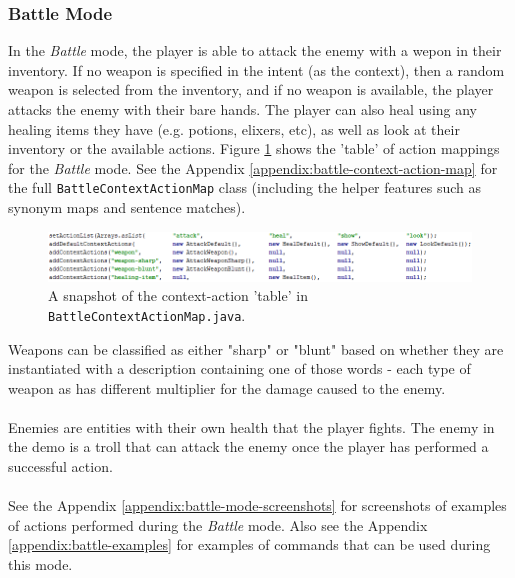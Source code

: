 \documentclass[11pt]{article}
\begin{document}
\subsubsection{Battle Mode}

In the \textit{Battle} mode, the player is able to attack the enemy with a wepon in their inventory. If no weapon is specified in the intent (as the context), then a random weapon is selected from the inventory, and if no weapon is available, the player attacks the enemy with their bare hands. The player can also heal using any healing items they have (e.g. potions, elixers, etc), as well as look at their inventory or the available actions. Figure \ref{fig:battle-context-action-map} shows the 'table' of action mappings for the \textit{Battle} mode. See the Appendix \ref{appendix:battle-context-action-map} for the full \texttt{BattleContextActionMap} class (including the helper features such as synonym maps and sentence matches).

\begin{center}
\begin{figure}[H]
\begin{center}
  \includegraphics[width=\linewidth]{battle-context-action-map.png}
  \caption{A snapshot of the context-action 'table' in \texttt{BattleContextActionMap.java}.}
  \label{fig:battle-context-action-map}
  \end{center}
\end{figure}
\end{center}

Weapons can be classified as either "sharp" or "blunt" based on whether they are instantiated with a description containing one of those words - each type of weapon as has different multiplier for the damage caused to the enemy.
\\
\\
Enemies are entities with their own health that the player fights. The enemy in the demo is a troll that can attack the enemy once the player has performed a successful action.
\\
\\
See the Appendix \ref{appendix:battle-mode-screenshots} for screenshots of examples of actions performed during the \textit{Battle} mode. Also see the Appendix \ref{appendix:battle-examples} for examples of commands that can be used during this mode.
\end{document}
